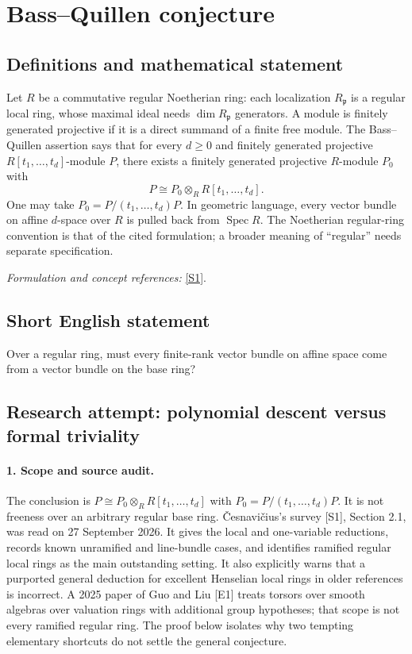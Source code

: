 \documentclass[11pt]{article}
\begin{document}
\section*{\texorpdfstring{Bass–Quillen conjecture}{Bass–Quillen conjecture}}\label{statement}
\subsection{Definitions and mathematical statement}
Let $R$ be a commutative regular Noetherian ring: each localization $R_{\mathfrak p}$ is a regular local ring, whose maximal ideal needs $\dim R_{\mathfrak p}$ generators. A module is finitely generated projective if it is a direct summand of a finite free module. The Bass--Quillen assertion says that for every $d\ge0$ and finitely generated projective $R[t_1,\ldots,t_d]$-module $P$, there exists a finitely generated projective $R$-module $P_0$ with
\[
 P\cong P_0\otimes_R R[t_1,\ldots,t_d].
\]
One may take $P_0=P/(t_1,\ldots,t_d)P$. In geometric language, every vector bundle on affine $d$-space over $R$ is pulled back from $\operatorname{Spec}R$. The Noetherian regular-ring convention is that of the cited formulation; a broader meaning of ``regular'' needs separate specification.
\par\smallskip\textit{Formulation and concept references:} \href{https://arxiv.org/html/2201.06424v4}{[S1]}.

\subsection{Short English statement}
Over a regular ring, must every finite-rank vector bundle on affine space come from a vector bundle on the base ring?
\subsection{Research attempt: polynomial descent versus formal triviality}
\paragraph{1. Scope and source audit.}
The conclusion is $P\cong P_0\otimes_R R[t_1,\ldots,t_d]$ with $P_0=P/(t_1,\ldots,t_d)P$. It is not freeness over an arbitrary regular base ring. \v{C}esnavi\v{c}ius's survey [S1], Section 2.1, was read on 27 September 2026. It gives the local and one-variable reductions, records known unramified and line-bundle cases, and identifies ramified regular local rings as the main outstanding setting. It also explicitly warns that a purported general deduction for excellent Henselian local rings in older references is incorrect. A 2025 paper of Guo and Liu [E1] treats torsors over smooth algebras over valuation rings with additional group hypotheses; that scope is not every ramified regular ring. The proof below isolates why two tempting elementary shortcuts do not settle the general conjecture.
\end{document}
